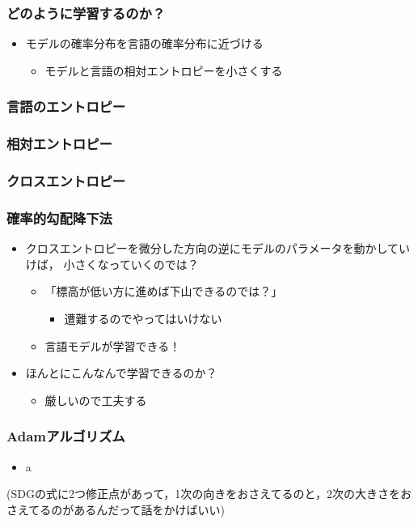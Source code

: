 \documentclass[14pt]{beamer}
\begin{document}
\begin{frame}
	\frametitle{どのように学習するのか？}

	\begin{itemize}
		\item モデルの確率分布を言語の確率分布に近づける
			\begin{itemize}
				\item モデルと言語の相対エントロピーを小さくする
			\end{itemize}
	\end{itemize}
\end{frame}

\begin{frame}
	\frametitle{言語のエントロピー}
\end{frame}

\begin{frame}
	\frametitle{相対エントロピー}
\end{frame}

\begin{frame}
	\frametitle{クロスエントロピー}
\end{frame}

\begin{frame}
	\frametitle{確率的勾配降下法}

	\begin{itemize}
		\item クロスエントロピーを微分した方向の逆にモデルのパラメータを動かしていけば，
			小さくなっていくのでは？
			\begin{itemize}
				\item 「標高が低い方に進めば下山できるのでは？」
					\begin{itemize}
						\item[] \hspace{5em} {\scriptsize \color{lightgray} 遭難するのでやってはいけない}
					\end{itemize}
				\item 言語モデルが学習できる！
			\end{itemize}
		\item ほんとにこんなんで学習できるのか？
			\begin{itemize}
				\item 厳しいので工夫する
			\end{itemize}
	\end{itemize}
\end{frame}

\begin{frame}
	\frametitle{Adamアルゴリズム}

	\begin{itemize}
		\item a
	\end{itemize}

	(SDGの式に2つ修正点があって，1次の向きをおさえてるのと，2次の大きさをおさえてるのがあるんだって話をかけばいい)
\end{frame}
\end{document}

